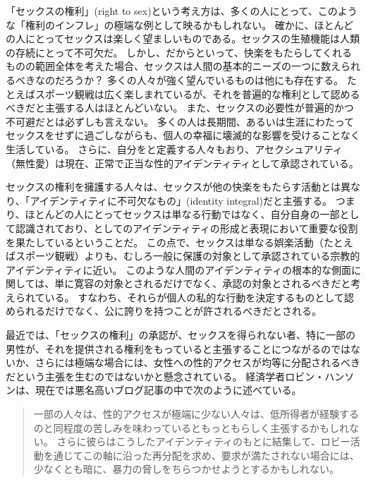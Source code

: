 \documentclass[paper=a4,book,openany]{jlreq}
\begin{document}
「セックスの権利」(right to sex)という考え方は、多くの人にとって、このような「権利のインフレ」の極端な例として映るかもしれない。
確かに、ほとんどの人にとってセックスは楽しく望ましいものである。セックスの生殖機能は人類の存続にとって不可欠だ。
しかし、だからといって、快楽をもたらしてくれるものの範囲全体を考えた場合、セックスは人間の基本的ニーズの一つに数えられるべきなのだろうか？  多くの人々が強く望んでいるものは他にも存在する。
たとえばスポーツ観戦は広く楽しまれているが、それを普遍的な権利として認めるべきだと主張する人はほとんどいない。
また、セックスの必要性が普遍的かつ不可避だとは必ずしも言えない。
多くの人は長期間、あるいは生涯にわたってセックスをせずに過ごしながらも、個人の幸福に壊滅的な影響を受けることなく生活している。
さらに、自分をと定義する人々もおり、アセクシュアリティ（無性愛）は現在、正常で正当な性的アイデンティティとして承認されている。

セックスの権利を擁護する人々は、セックスが他の快楽をもたらす活動とは異なり、「アイデンティティに不可欠なもの」(identity integral)だと主張する。
つまり、ほとんどの人にとってセックスは単なる行動ではなく、自分自身の一部として認識されており、としてのアイデンティティの形成と表現において重要な役割を果たしているということだ。
この点で、セックスは単なる娯楽活動（たとえばスポーツ観戦）よりも、むしろ一般に保護の対象として承認されている宗教的アイデンティティに近い。
このような人間のアイデンティティの根本的な側面に関しては、単に寛容の対象とされるだけでなく、承認の対象とされるべきだと考えられている。
すなわち、それらが個人の私的な行動を決定するものとして認められるだけでなく、公に誇りを持つことが許されるべきだとされる。

最近では、「セックスの権利」の承認が、セックスを得られない者、特に一部の男性が、それを提供される権利をもっていると主張することにつながるのではないか、さらには極端な場合には、女性への性的アクセスが均等に分配されるべきだという主張を生むのではないかと懸念されている。
経済学者ロビン・ハンソンは、現在では悪名高いブログ記事の中で次のように述べている。

\begin{quote}
一部の人々は、性的アクセスが極端に少ない人々は、低所得者が経験するのと同程度の苦しみを味わっているともっともらしく主張するかもしれない。
さらに彼らはこうしたアイデンティティのもとに結集して、ロビー活動を通じてこの軸に沿った再分配を求め、要求が満たされない場合には、少なくとも暗に、暴力の脅しをちらつかせようとするかもしれない。
\citep{hanson18:_two_types_envy}
\end{quote}
\end{document}
